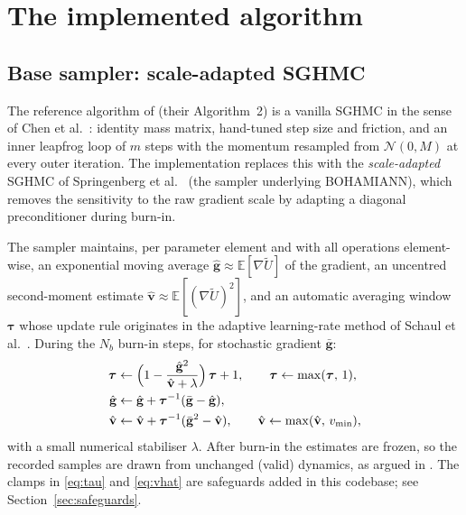 \documentclass[11pt]{article}
\newcommand{\N}{\mathcal{N}}
\newcommand{\gbar}{\bar{\mathbf{g}}}
\newcommand{\vhat}{\hat{\mathbf{v}}}
\newcommand{\ghat}{\hat{\mathbf{g}}}
\newcommand{\btau}{\bm{\tau}}
\newcommand{\gradU}{\nabla \widetilde{U}}
\begin{document}
\section{The implemented algorithm}

\subsection{Base sampler: scale-adapted SGHMC}
\label{sec:adaptive}

The reference algorithm of \cite{wu2025} (their Algorithm~2) is a vanilla
SGHMC in the sense of Chen et al.~\cite{chen2014}: identity mass matrix,
hand-tuned step size and friction, and an inner leapfrog loop of $m$ steps
with the momentum resampled from $\N(0,M)$ at every outer iteration.  The
implementation replaces this with the \emph{scale-adapted} SGHMC of
Springenberg et al.~\cite{springenberg2016} (the sampler underlying
BOHAMIANN), which removes the sensitivity to the raw gradient scale by
adapting a diagonal preconditioner during burn-in.

The sampler maintains, per parameter element and with all operations
element-wise, an exponential moving average $\ghat \approx \mathbb{E}[\gradU]$
of the gradient, an uncentred second-moment estimate
$\vhat \approx \mathbb{E}[(\gradU)^2]$, and an automatic averaging window
$\btau$ whose update rule originates in the adaptive learning-rate method of
Schaul et al.~\cite{schaul2013}.  During the $N_b$ burn-in steps, for
stochastic gradient $\gbar$:
\begin{align}
  \btau &\leftarrow
    \Bigl(1 - \frac{\ghat^{2}}{\vhat + \lambda}\Bigr)\,\btau + 1,
    \qquad \btau \leftarrow \max(\btau,\,1),
    \label{eq:tau}\\
  \ghat &\leftarrow \ghat + \btau^{-1}(\gbar - \ghat),\\
  \vhat &\leftarrow \vhat + \btau^{-1}(\gbar^{2} - \vhat),
    \qquad \vhat \leftarrow \max(\vhat,\,v_{\min}),
    \label{eq:vhat}
\end{align}
with a small numerical stabiliser $\lambda$.  After burn-in the estimates are
frozen, so the recorded samples are drawn from unchanged (valid) dynamics, as
argued in \cite{springenberg2016}.  The clamps in \eqref{eq:tau} and
\eqref{eq:vhat} are safeguards added in this codebase; see
Section~\ref{sec:safeguards}.
\end{document}
